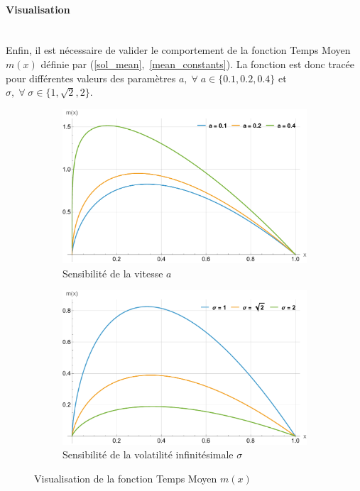 \paragraph{Visualisation}\phantom{}\\
Enfin, il est nécessaire de valider le comportement de la fonction Temps Moyen $m(x)$ définie par (\ref{sol_mean},~\ref{mean_constants}). La fonction est donc tracée pour différentes valeurs des paramètres $a,\;\forall\;a\in\{0.1,0.2,0.4\}$ et $\sigma,\;\forall\;\sigma\in\{1,\sqrt{2},2\}$.


\begin{figure}[htb]
    \centering
    \begin{subfigure}{0.45\linewidth}
        \includegraphics[width=\linewidth]{img/validation/Mean/mean_a.pdf}
        \caption{Sensibilité de la vitesse $a$}\label{fig:Mean_a_visualisation}
    \end{subfigure}
    \hfill
    \begin{subfigure}{0.45\linewidth}
        \includegraphics[width=\linewidth]{img/validation/Mean/mean_sigma.pdf}
        \caption{Sensibilité de la volatilité infinitésimale $\sigma$}\label{fig:Mean_sigma_visualisation}
    \end{subfigure}
    \caption{Visualisation de la fonction Temps Moyen $m(x)$}\label{fig:MeanVisualisation}
\end{figure}
